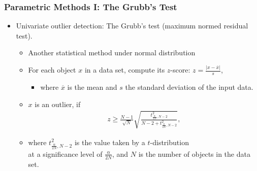 \begin{frame}
	\frametitle{Parametric Methods I: The Grubb's Test}
	\begin{itemize}
		\item Univariate outlier detection: The Grubb's test (maximum normed residual test).
		      \begin{itemize}
			      \item Another statistical method under normal distribution
			      \item For each object $x$ in a data set, compute its $z$-score:  $z = \frac{\vert x - \overline{x}\vert}{s}$,
			            \begin{itemize}
				            \item where $\overline{x}$ is the mean and $s$ the standard deviation of the input data.
			            \end{itemize}
			      \item $x$ is an outlier, if
			            \begin{align}
				            z \geq \frac{N-1}{\sqrt{N}} \sqrt{\frac{t^2_{\frac{\alpha}{2N},N-2}}{N-2 + t^2_{\frac{\alpha}{2N},N-2}}},
			            \end{align}
		      \end{itemize}
		      \begin{itemize}
			      \item where $t^2_{\frac{\alpha}{2N},N-2}$ is the value taken by a $t$-distribution \\
			            at a significance level of $\frac{\alpha}{2N}$, and $N$ is the number of objects in the data set.
		      \end{itemize}
	\end{itemize}
\end{frame}


